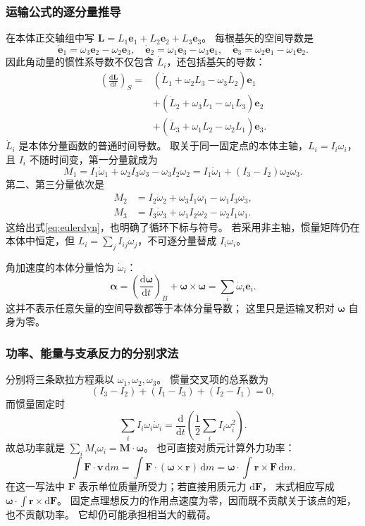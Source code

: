 \documentclass[UTF8,zihao=-4,fontset=fandol,a4paper]{ctexart}
\newcommand{\vect}[1]{\bm{#1}}
\newcommand{\dd}{\mathrm d}
\begin{document}
\subsubsection*{运输公式的逐分量推导}
在本体正交轴组中写
$\vect L=L_1\vect e_1+L_2\vect e_2+L_3\vect e_3$。
每根基矢的空间导数是
\[
\dot{\vect e}_1=\omega_3\vect e_2-\omega_2\vect e_3,
\quad
\dot{\vect e}_2=\omega_1\vect e_3-\omega_3\vect e_1,
\quad
\dot{\vect e}_3=\omega_2\vect e_1-\omega_1\vect e_2.
\]
因此角动量的惯性系导数不仅包含 $\dot L_i$，还包括基矢的导数：
\[
\begin{aligned}
\left(\frac{\dd\vect L}{\dd t}\right)_S
={}&(\dot L_1+\omega_2L_3-\omega_3L_2)\vect e_1\\
&+(\dot L_2+\omega_3L_1-\omega_1L_3)\vect e_2\\
&+(\dot L_3+\omega_1L_2-\omega_2L_1)\vect e_3.
\end{aligned}
\]
$\dot L_i$ 是本体分量函数的普通时间导数。
取关于同一固定点的本体主轴，$L_i=I_i\omega_i$，
且 $I_i$ 不随时间变，第一分量就成为
\[
M_1=I_1\dot\omega_1+
\omega_2I_3\omega_3-\omega_3I_2\omega_2
=I_1\dot\omega_1+(I_3-I_2)\omega_2\omega_3.
\]
第二、第三分量依次是
\[
\begin{aligned}
M_2&=I_2\dot\omega_2+
\omega_3I_1\omega_1-\omega_1I_3\omega_3,\\
M_3&=I_3\dot\omega_3+
\omega_1I_2\omega_2-\omega_2I_1\omega_1.
\end{aligned}
\]
这给出式\eqref{eq:eulerdyn}，也明确了循环下标与符号。
若采用非主轴，惯量矩阵仍在本体中恒定，但
$L_i=\sum_j I_{ij}\omega_j$，不可逐分量替成 $I_i\omega_i$。

角加速度的本体分量恰为 $\dot\omega_i$：
\[
\vect\alpha=
\left(\frac{\dd\vect\omega}{\dd t}\right)_B
+\vect\omega\times\vect\omega
=\sum_i\dot\omega_i\vect e_i.
\]
这并不表示任意矢量的空间导数都等于本体分量导数；
这里只是运输叉积对 $\vect\omega$ 自身为零。

\subsubsection*{功率、能量与支承反力的分别求法}
分别将三条欧拉方程乘以 $\omega_1,\omega_2,\omega_3$。
惯量交叉项的总系数为
\[
(I_3-I_2)+(I_1-I_3)+(I_2-I_1)=0,
\]
而惯量固定时
\[
\sum_i I_i\omega_i\dot\omega_i
=\frac{\dd}{\dd t}\left(\frac12\sum_i I_i\omega_i^2\right).
\]
故总功率就是 $\sum_i M_i\omega_i=\vect M\cdot\vect\omega$。
也可直接对质元计算外力功率：
\[
\int\vect F\cdot\vect v\,\dd m
=\int\vect F\cdot(\vect\omega\times\vect r)\,\dd m
=\vect\omega\cdot\int\vect r\times\vect F\,\dd m.
\]
在这一写法中 $\vect F$ 表示单位质量所受力；若直接用质元力 $\dd\vect F$，
末式相应写成 $\vect\omega\cdot\int\vect r\times\dd\vect F$。
固定点理想反力的作用点速度为零，因而既不贡献关于该点的矩，也不贡献功率。
它却仍可能承担相当大的载荷。
\end{document}
